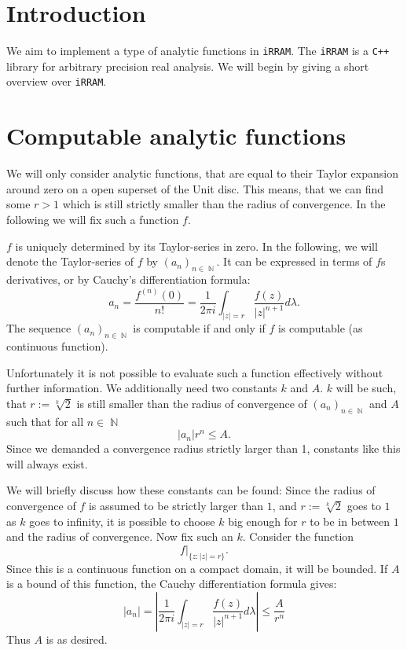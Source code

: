 \documentclass{article}
\DeclareMathOperator{\NN}{\ensuremath{\mathbb{N}}\xspace}
\newcommand{\irram}{\texttt{iRRAM}\xspace}
\newcommand{\cc}{\texttt{C++}\xspace}
\begin{document}
\tableofcontents
\setcounter{section}{-1}
\section{Introduction}

We aim to implement a type of analytic functions in \irram. The \irram is a \cc library for arbitrary precision real analysis. We will begin by giving a short overview over \irram.

\section{Computable analytic functions}

We will only consider analytic functions, that are equal to their Taylor expansion around zero on a open superset of the Unit disc. This means, that we can find some $r>1$ which is still strictly smaller than the radius of convergence. In the following we will fix such a function $f$.

$f$ is uniquely determined by its Taylor-series in zero. In the following, we will denote the Taylor-series of $f$ by $(a_n)_{n\in \NN}$. It can be expressed in terms of $f$s derivatives, or by Cauchy's differentiation formula:
\[ a_n = \frac{f^{(n)}(0)}{n!} = \frac 1 {2\pi i}\int_{|z| = r} \frac{f(z)}{|z|^{n+1}} d\lambda. \]
The sequence $(a_n)_{n\in \NN}$ is computable if and only if $f$ is computable (as continuous function). 

Unfortunately it is not possible to evaluate such a function effectively without further information. We additionally need two constants $k$ and $A$. $k$ will be such, that $r:=\sqrt[k]{2}$ is still smaller than the radius of convergence of $(a_n)_{n\in \NN}$ and $A$ such that for all $n\in \NN$
\[ |a_n|  r^n \leq A. \]
Since we demanded a convergence radius strictly larger than 1, constants like this will always exist.

We will briefly discuss how these constants can be found: Since the radius of convergence of $f$ is assumed to be strictly larger than $1$, and $r:=\sqrt[k] 2$ goes to $1$ as $k$ goes to infinity, it is possible to choose $k$ big enough for $r$ to be in between $1$ and the radius of convergence. Now fix such an $k$. Consider the function
\[ f|_{\{z:|z| = r\}}. \]
Since this is a continuous function on a compact domain, it will be bounded. If $A$ is a bound of this function, the Cauchy differentiation formula gives:
\[ |a_n |=  \left|\frac 1 {2\pi i}\int_{|z| = r} \frac{f(z)}{|z|^{n+1}} d\lambda\right| \leq \frac A {r^n} \]
Thus $A$ is as desired.
\end{document}
